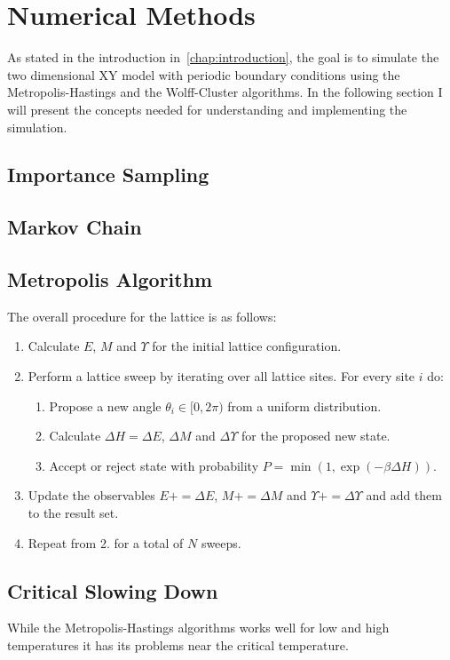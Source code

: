 \section{Numerical Methods}\label{sec:theo:numerical_methods}
	As stated in the introduction in~\cref{chap:introduction}, the goal is to simulate the two dimensional XY model with periodic boundary conditions using the Metropolis-Hastings and the Wolff-Cluster algorithms. In the following section I will present the concepts needed for understanding and implementing the simulation.
	
	\subsection{Importance Sampling}
		
		
	\subsection{Markov Chain}

	\subsection{Metropolis Algorithm}
	
	
		The overall procedure for the lattice is as follows:
		\begin{enumerate}
			\item Calculate $E$, $M$ and $\Upsilon$ for the initial lattice configuration.
			\item Perform a lattice sweep by iterating over all lattice sites. For every site $i$ do:
			\begin{enumerate}
				\item Propose a new angle $\theta_i \in [0,2\pi)$ from a uniform distribution.
				\item Calculate $\Delta H = \Delta E$, $\Delta M$ and $\Delta \Upsilon$ for the proposed new state.
				\item Accept or reject state with probability $P = \min{(1, \exp{(-\beta\Delta H)})}$.
			\end{enumerate}
			\item Update the observables $E \mathrel{{+}{=}} \Delta E$, $M \mathrel{{+}{=}} \Delta M$ and $\Upsilon \mathrel{{+}{=}} \Delta \Upsilon$ and add them to the result set.
			\item Repeat from 2. for a total of $N$ sweeps.
		\end{enumerate}
		
	\subsection{Critical Slowing Down}\label{sec:theo:critical_slowing_down}
		While the Metropolis-Hastings algorithms works well for low and high temperatures it has its problems near the critical temperature. 
		
